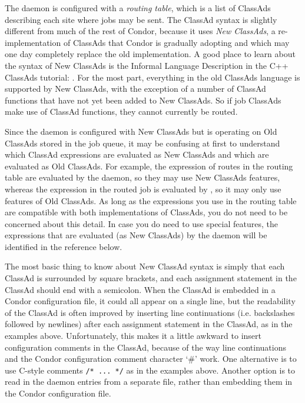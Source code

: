 The  daemon is configured with a \textit{routing table}, which is a list
of ClassAds describing each site where jobs may be sent.  The ClassAd
syntax is slightly different from much of the rest of Condor, because
it uses \emph{New ClassAds}, a re-implementation of ClassAds that
Condor is gradually adopting and which may one day completely replace
the old implementation.  A good place to learn about the syntax of New
ClassAds is the Informal Language Description in the C++ ClassAds
tutorial: .
For the most part, everything in the old ClassAds language is
supported by New ClassAds, with the exception of a number of ClassAd
functions that have not yet been added to New ClassAds.  So if job
ClassAds make use of ClassAd functions, they cannot currently be
routed.

Since the  daemon is configured with New ClassAds but is operating on
Old ClassAds stored in the job queue, it may be confusing at first to
understand which ClassAd expressions are evaluated as New ClassAds and
which are evaluated as Old ClassAds.  For example, the
 expression of routes in the routing table are
evaluated by the  daemon, so they may use New ClassAds features,
whereas the  expression in the routed job is
evaluated by , so it may only use features of Old
ClassAds.  As long as the expressions you use in the routing table are
compatible with both implementations of ClassAds, you do not need to
be concerned about this detail.  In case you do need to use special
features, the expressions that are evaluated (as New ClassAds) by the
 daemon will be identified in the reference below.

The most basic thing to know about New ClassAd syntax is simply that
each ClassAd is surrounded by square brackets, and each assignment
statement in the ClassAd should end with a semicolon.  When the
ClassAd is embedded in a Condor configuration file, it could all
appear on a single line, but the readability of the ClassAd is often
improved by inserting line continuations (i.e. backslashes followed by
newlines) after each assignment statement in the ClassAd, as in the
examples above.  Unfortunately, this makes it a little awkward to
insert configuration comments in the ClassAd, because of the way line
continuations and the Condor configuration comment character `\#' work.
One alternative is to use C-style comments \verb|/* ... */| as in the
examples above.  Another option is to read in the  daemon entries
from a separate file, rather than embedding them in the Condor
configuration file.

